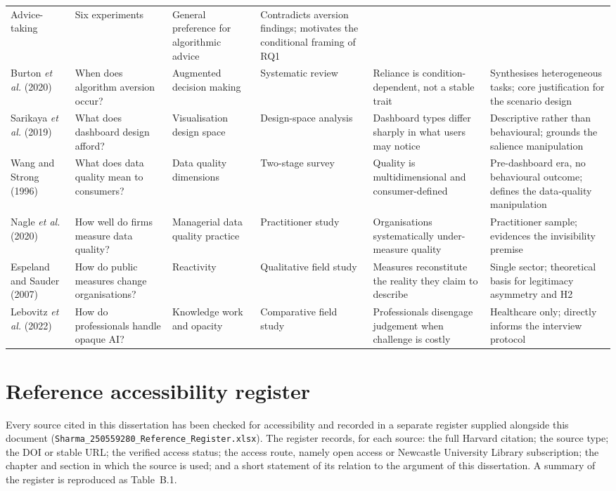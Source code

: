 \documentclass[11pt,a4paper]{article}
\numberwithin{figure}{section}
\numberwithin{table}{section}
\newcommand{\xref}[1]{\textcolor{citeblue}{#1}}         %
\begin{document}
\begin{longtable}{@{}p{2.1cm} p{2.4cm} p{2.4cm} p{2.4cm} p{2.5cm} p{2.6cm}@{}}
Advice-taking & Six experiments & General preference for algorithmic advice & Contradicts aversion
findings; motivates the conditional framing of RQ1 \\
\addlinespace
\footnotesize Burton \emph{et al.} (2020) & When does algorithm aversion occur? & Augmented decision
making & Systematic review & Reliance is condition-dependent, not a stable trait & Synthesises
heterogeneous tasks; core justification for the scenario design \\
\addlinespace
\footnotesize Sarikaya \emph{et al.} (2019) & What does dashboard design afford? & Visualisation
design space & Design-space analysis & Dashboard types differ sharply in what users may notice &
Descriptive rather than behavioural; grounds the salience manipulation \\
\addlinespace
\footnotesize Wang and Strong (1996) & What does data quality mean to consumers? & Data quality
dimensions & Two-stage survey & Quality is multidimensional and consumer-defined & Pre-dashboard
era, no behavioural outcome; defines the data-quality manipulation \\
\addlinespace
\footnotesize Nagle \emph{et al.} (2020) & How well do firms measure data quality? & Managerial data
quality practice & Practitioner study & Organisations systematically under-measure quality &
Practitioner sample; evidences the invisibility premise \\
\addlinespace
\footnotesize Espeland and Sauder (2007) & How do public measures change organisations? & Reactivity
& Qualitative field study & Measures reconstitute the reality they claim to describe & Single
sector; theoretical basis for legitimacy asymmetry and H2 \\
\addlinespace
\footnotesize Lebovitz \emph{et al.} (2022) & How do professionals handle opaque AI? & Knowledge work
and opacity & Comparative field study & Professionals disengage judgement when challenge is costly &
Healthcare only; directly informs the interview protocol \\
\end{longtable}

\section{Reference accessibility register}

Every source cited in this dissertation has been checked for accessibility and recorded in a
separate register supplied alongside this document
(\texttt{Sharma\_250559280\_Reference\_Register.xlsx}). The register records, for each source: the
full Harvard citation; the source type; the DOI or stable URL; the verified access status; the
access route, namely open access or Newcastle University Library subscription; the chapter and
section in which the source is used; and a short statement of its relation to the argument of this
dissertation. A summary of the register is reproduced as \xref{Table~B.1}.
\end{document}
